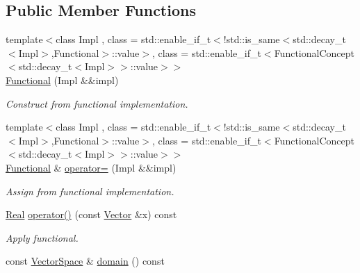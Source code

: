 \subsection*{Public Member Functions}
\begin{DoxyCompactItemize}
\item 
\hypertarget{classSpacy_1_1Functional_ac3be0a8589d27e5fec37102ab820fca8}{}{\footnotesize template$<$class Impl , class  = std\+::enable\+\_\+if\+\_\+t$<$!std\+::is\+\_\+same$<$std\+::decay\+\_\+t$<$\+Impl$>$,\+Functional$>$\+::value$>$, class  = std\+::enable\+\_\+if\+\_\+t$<$\+Functional\+Concept$<$std\+::decay\+\_\+t$<$\+Impl$>$$>$\+::value$>$$>$ }\\\hyperlink{classSpacy_1_1Functional_ac3be0a8589d27e5fec37102ab820fca8}{Functional} (Impl \&\&impl)\label{classSpacy_1_1Functional_ac3be0a8589d27e5fec37102ab820fca8}

\begin{DoxyCompactList}\small\item\em Construct from functional implementation. \end{DoxyCompactList}\item 
\hypertarget{classSpacy_1_1Functional_a5f826033ebe432a074c9934129e73945}{}{\footnotesize template$<$class Impl , class  = std\+::enable\+\_\+if\+\_\+t$<$!std\+::is\+\_\+same$<$std\+::decay\+\_\+t$<$\+Impl$>$,\+Functional$>$\+::value$>$, class  = std\+::enable\+\_\+if\+\_\+t$<$\+Functional\+Concept$<$std\+::decay\+\_\+t$<$\+Impl$>$$>$\+::value$>$$>$ }\\\hyperlink{classSpacy_1_1Functional}{Functional} \& \hyperlink{classSpacy_1_1Functional_a5f826033ebe432a074c9934129e73945}{operator=} (Impl \&\&impl)\label{classSpacy_1_1Functional_a5f826033ebe432a074c9934129e73945}

\begin{DoxyCompactList}\small\item\em Assign from functional implementation. \end{DoxyCompactList}\item 
\hypertarget{classSpacy_1_1Functional_af51f903133f2fbf92cf12f790e429919}{}\hyperlink{classSpacy_1_1Real}{Real} \hyperlink{classSpacy_1_1Functional_af51f903133f2fbf92cf12f790e429919}{operator()} (const \hyperlink{classSpacy_1_1Vector}{Vector} \&x) const \label{classSpacy_1_1Functional_af51f903133f2fbf92cf12f790e429919}

\begin{DoxyCompactList}\small\item\em Apply functional. \end{DoxyCompactList}\item 
\hypertarget{classSpacy_1_1Functional_a6f4ada552c025579bcce852316a071be}{}const \hyperlink{classSpacy_1_1VectorSpace}{Vector\+Space} \& \hyperlink{classSpacy_1_1Functional_a6f4ada552c025579bcce852316a071be}{domain} () const \label{classSpacy_1_1Functional_a6f4ada552c025579bcce852316a071be}


\end{DoxyCompactItemize}
